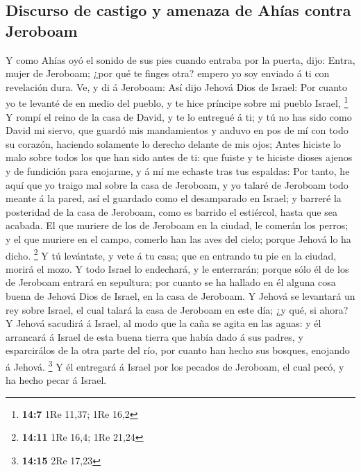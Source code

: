 \hypertarget{discurso-de-castigo-y-amenaza-de-ahuxedas-contra-jeroboam}{%
\subsection{Discurso de castigo y amenaza de Ahías contra
Jeroboam}\label{discurso-de-castigo-y-amenaza-de-ahuxedas-contra-jeroboam}}

 Y como Ahías oyó el sonido de sus pies cuando entraba por
la puerta, dijo: Entra, mujer de Jeroboam; ¿por qué te finges otra?
empero yo soy enviado á ti con revelación dura.  Ve, y di
á Jeroboam: Así dijo Jehová Dios de Israel: Por cuanto yo te levanté de
en medio del pueblo, y te hice príncipe sobre mi pueblo Israel,
\footnote{\textbf{14:7} 1Re 11,37; 1Re 16,2}  Y rompí el
reino de la casa de David, y te lo entregué á ti; y tú no has sido como
David mi siervo, que guardó mis mandamientos y anduvo en pos de mí con
todo su corazón, haciendo solamente lo derecho delante de mis ojos;
 Antes hiciste lo malo sobre todos los que han sido antes
de ti: que fuiste y te hiciste dioses ajenos y de fundición para
enojarme, y á mí me echaste tras tus espaldas:  Por
tanto, he aquí que yo traigo mal sobre la casa de Jeroboam, y yo talaré
de Jeroboam todo meante á la pared, así el guardado como el desamparado
en Israel; y barreré la posteridad de la casa de Jeroboam, como es
barrido el estiércol, hasta que sea acabada.  El que
muriere de los de Jeroboam en la ciudad, le comerán los perros; y el que
muriere en el campo, comerlo han las aves del cielo; porque Jehová lo ha
dicho. \footnote{\textbf{14:11} 1Re 16,4; 1Re 21,24}  Y
tú levántate, y vete á tu casa; que en entrando tu pie en la ciudad,
morirá el mozo.  Y todo Israel lo endechará, y le
enterrarán; porque sólo él de los de Jeroboam entrará en sepultura; por
cuanto se ha hallado en él alguna cosa buena de Jehová Dios de Israel,
en la casa de Jeroboam.  Y Jehová se levantará un rey
sobre Israel, el cual talará la casa de Jeroboam en este día; ¿y qué, si
ahora?  Y Jehová sacudirá á Israel, al modo que la caña
se agita en las aguas: y él arrancará á Israel de esta buena tierra que
había dado á sus padres, y esparcirálos de la otra parte del río, por
cuanto han hecho sus bosques, enojando á Jehová. \footnote{\textbf{14:15}
  2Re 17,23}  Y él entregará á Israel por los pecados de
Jeroboam, el cual pecó, y ha hecho pecar á Israel.

